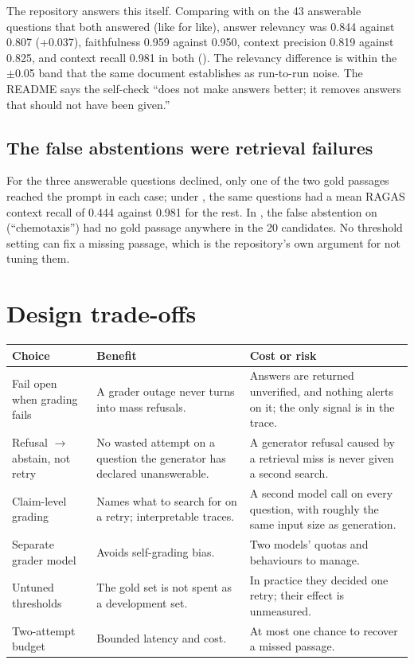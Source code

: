 The repository answers this itself. Comparing  with  on the 43 answerable questions that both answered (like for like), answer relevancy was 0.844 against 0.807 (+0.037), faithfulness 0.959 against 0.950, context precision 0.819 against 0.825, and context recall 0.981 in both (). The relevancy difference is within the $\pm$0.05 band that the same document establishes as run-to-run noise. The README says the self-check \enquote{does not make answers better; it removes answers that should not have been given.}

\subsection{The false abstentions were retrieval failures}

For the three answerable questions  declined, only one of the two gold passages reached the prompt in each case; under , the same questions had a mean RAGAS context recall of 0.444 against 0.981 for the rest. In , the false abstention on  (\enquote{chemotaxis}) had no gold passage anywhere in the 20 candidates. No threshold setting can fix a missing passage, which is the repository's own argument for not tuning them.

\section{Design trade-offs}

\begin{center}
\begin{tabularx}{\textwidth}{@{}>{\raggedright\arraybackslash}p{3.8cm}LL@{}}
\toprule
\textbf{Choice} & \textbf{Benefit} & \textbf{Cost or risk}\\
\midrule
Fail open when grading fails & A grader outage never turns into mass refusals. & Answers are returned unverified, and nothing alerts on it; the only signal is  in the trace.\\
Refusal $\rightarrow$ abstain, not retry & No wasted attempt on a question the generator has declared unanswerable. & A generator refusal caused by a retrieval miss is never given a second search.\\
Claim-level grading & Names what to search for on a retry; interpretable traces. & A second model call on every question, with roughly the same input size as generation.\\
Separate grader model & Avoids self-grading bias. & Two models' quotas and behaviours to manage.\\
Untuned thresholds & The gold set is not spent as a development set. & In practice they decided one retry; their effect is unmeasured.\\
Two-attempt budget & Bounded latency and cost. & At most one chance to recover a missed passage.\\
\bottomrule
\end{tabularx}
\end{center}

